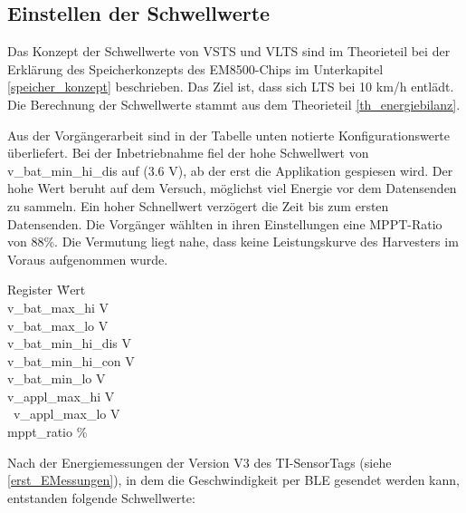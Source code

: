 
\subsection{Einstellen der Schwellwerte}
\label{v_schwellwerte}

Das Konzept der Schwellwerte von VSTS und VLTS sind im Theorieteil bei der Erklärung des Speicherkonzepts des EM8500-Chips im Unterkapitel \ref{speicher_konzept} beschrieben. Das Ziel ist, dass sich LTS bei 10 km/h entlädt. Die Berechnung der Schwellwerte stammt aus dem Theorieteil \ref{th_energiebilanz}.

Aus der Vorgängerarbeit sind in der Tabelle unten notierte Konfigurationswerte überliefert. Bei der Inbetriebnahme fiel der hohe Schwellwert von v\_bat\_min\_hi\_dis auf (3.6 V), ab der erst die Applikation gespiesen wird. Der hohe Wert beruht auf dem Versuch, möglichst viel Energie vor dem Datensenden zu sammeln. Ein hoher Schnellwert verzögert die Zeit bis zum ersten Datensenden. Die Vorgänger wählten in ihren Einstellungen eine MPPT-Ratio von 88\thinspace\%. Die Vermutung liegt nahe, dass keine Leistungskurve des Harvesters im Voraus aufgenommen wurde.

\begin{minipage}{\textwidth}
    \begin{tabbing}
    Register \hspace{4cm} \quad\= Wert \\[0.8ex]
    v\_bat\_max\_hi        V \\
    v\_bat\_max\_lo        V \\
    v\_bat\_min\_hi\_dis   V \\
    v\_bat\_min\_hi\_con   V \\
    v\_bat\_min\_lo        V \\
    v\_appl\_max\_hi       V \\\
    v\_appl\_max\_lo       V \\ 
    mppt\_ratio            \thinspace\% \\
    \end{tabbing}
\end{minipage}

Nach der Energiemessungen der Version V3 des TI-SensorTags (siehe \ref{erst_EMessungen}), in dem die Geschwindigkeit per BLE gesendet werden kann, entstanden folgende Schwellwerte:

